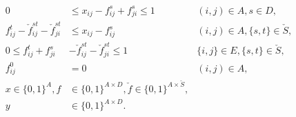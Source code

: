 \begin{subequations}
\begin{flalign}
\label{con:mfinpf2:xbound} 0&\leq x_{ij}-f_{ij}^s+f_{ji}^s  \leq 1 & (i,j)\in A, s\in D,\\
\label{con:mfinpf2:fcap} f^t_{ij} - \check{f}^{st}_{ij} - \check{f}^{st}_{ji} &\leq  x_{ij}-f^s_{ij} & (i,j)\in A, \{s,t\}\in \check{S},\\
\label{con:mfinpf2:fbound} 0  \leq f_{ij}^t+f_{ji}^s & -\check{f}_{ij}^{st}-\check{f}_{ji}^{st}  \leq 1 & \{i,j\}\in E,\{s,t\}\in \check{S},\\
\label{con:mfinpf2:fij00} f^0_{ij} &=0 & (i,j)\in A,\\
\label{con:mfinpf2:dim} x \in \{0,1\}^{A},f&\in\{0,1\}^{A \times D},\check{f}\in\{0,1\}^{A\times \check{S}},\\
\label{con:mfinpf2:dimy} y &\in \{0,1\}^{A\times D}.
\end{flalign}
\end{subequations}

